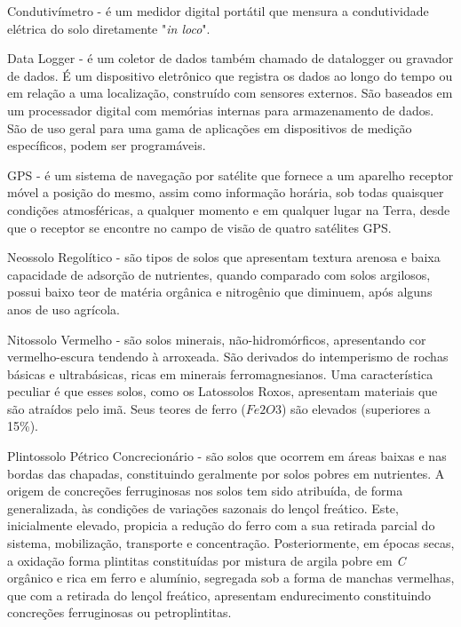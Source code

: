 
\begin{glossario}
  \label{glossario}

\item[Condutivímetro] - é um medidor digital portátil que mensura a condutividade elétrica do solo diretamente "\emph{in loco}".

\item[Data Logger] - é um coletor de dados também chamado de datalogger ou gravador de dados. É um dispositivo eletrônico que registra os dados ao longo do tempo ou em relação a uma localização, construído com sensores externos. São baseados em um processador digital com memórias internas para armazenamento de dados. São de uso geral para uma gama de aplicações em dispositivos de medição específicos, podem ser programáveis.

\item[GPS] - é um sistema de navegação por satélite que fornece a um aparelho receptor móvel a posição do mesmo, assim como informação horária, sob todas quaisquer condições atmosféricas, a qualquer momento e em qualquer lugar na Terra, desde que o receptor se encontre no campo de visão de quatro satélites GPS.

\item[Neossolo Regolítico] - são tipos de solos que apresentam textura arenosa e baixa capacidade de adsorção de nutrientes, quando comparado com solos argilosos, possui baixo teor de matéria orgânica e nitrogênio que diminuem, após alguns anos de uso agrícola.

\item[Nitossolo Vermelho] - são solos minerais, não-hidromórficos, apresentando cor vermelho-escura tendendo à arroxeada. São derivados do intemperismo de rochas básicas e ultrabásicas, ricas em minerais ferromagnesianos. Uma característica peculiar é que esses solos, como os Latossolos Roxos, apresentam materiais que são atraídos pelo imã. Seus teores de ferro ($Fe2O3$) são elevados (superiores a 15\%).

\item[Plintossolo Pétrico Concrecionário] - são solos que ocorrem em áreas baixas e nas bordas das chapadas, constituindo geralmente por solos pobres em nutrientes. A origem de concreções ferruginosas nos solos tem sido atribuída, de forma generalizada, às condições de variações sazonais do lençol freático. Este, inicialmente elevado, propicia a redução do ferro com a sua retirada parcial do sistema, mobilização, transporte e concentração. Posteriormente, em épocas secas, a oxidação forma plintitas constituídas por mistura de argila pobre em \emph{C} orgânico e rica em ferro e alumínio, segregada sob a forma de manchas vermelhas, que com a retirada do lençol freático, apresentam endurecimento constituindo concreções ferruginosas ou petroplintitas.


\end{glossario}
